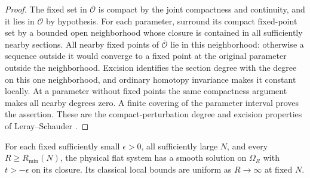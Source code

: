 \begin{proof}
The fixed set in $\overline{\mathcal O}$ is compact by the joint
compactness and continuity, and it lies in $\mathcal O$ by
hypothesis.  For each parameter, surround its compact fixed-point
set by a bounded open neighborhood whose closure is contained in
all sufficiently nearby sections.  All nearby fixed points of
$\overline{\mathcal O}$ lie in this neighborhood: otherwise a
sequence outside it would converge to a fixed point at the
original parameter outside the neighborhood.  Excision identifies
the section degree with the degree on this one neighborhood, and
ordinary homotopy invariance makes it constant locally.  At a
parameter without fixed points the same compactness argument
makes all nearby degrees zero.  A finite covering of the
parameter interval proves the assertion.  These are the
compact-perturbation degree and excision properties of
Leray--Schauder \cite{lerayschauder1934}.
\end{proof}

\begin{proposition}\label{prop:fc-degree}
For each fixed sufficiently small $\epsilon>0$, all sufficiently
large $N$, and every $R\ge R_{\min}(N)$, the physical flat system
has a smooth solution on $\Omega_R$ with $t> -\epsilon$ on its
closure.  Its classical local bounds are uniform as $R\to\infty$
at fixed $N$.
\end{proposition}

